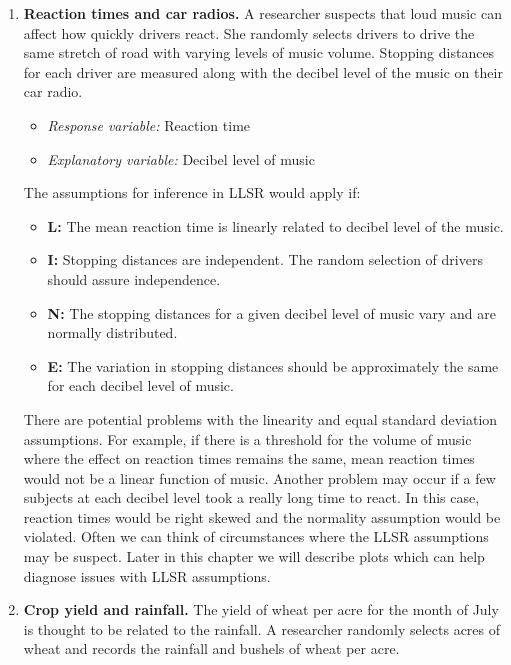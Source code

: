 \documentclass[
]{krantz}
\providecommand{\tightlist}{%
  \setlength{\itemsep}{0pt}\setlength{\parskip}{0pt}}
\begin{document}
\begin{enumerate}
\def\labelenumi{\arabic{enumi})}
\item
  \textbf{Reaction times and car radios.} A researcher suspects that loud music can affect how quickly drivers react. She randomly selects drivers to drive the same stretch of road with varying levels of music volume. Stopping distances for each driver are measured along with the decibel level of the music on their car radio.

  \begin{itemize}
  \tightlist
  \item
    \emph{Response variable:} Reaction time
  \item
    \emph{Explanatory variable:} Decibel level of music
  \end{itemize}

  The assumptions for inference in LLSR would apply if:

  \begin{itemize}
  \tightlist
  \item
    \textbf{L:} The mean reaction time is linearly related to decibel level of the music.
  \item
    \textbf{I:} Stopping distances are independent. The random selection of drivers should assure independence.
  \item
    \textbf{N:} The stopping distances for a given decibel level of music vary and are normally distributed.
  \item
    \textbf{E:} The variation in stopping distances should be approximately the same for each decibel level of music.
  \end{itemize}

  There are potential problems with the linearity and equal standard deviation assumptions. For example, if there is a threshold for the volume of music where the effect on reaction times remains the same, mean reaction times would not be a linear function of music. Another problem may occur if a few subjects at each decibel level took a really long time to react. In this case, reaction times would be right skewed and the normality assumption would be violated. Often we can think of circumstances where the LLSR assumptions may be suspect. Later in this chapter we will describe plots which can help diagnose issues with LLSR assumptions.
\item
  \textbf{Crop yield and rainfall.} The yield of wheat per acre for the month of July is thought to be related to the rainfall. A researcher randomly selects acres of wheat and records the rainfall and bushels of wheat per acre.


\end{enumerate}
\end{document}
